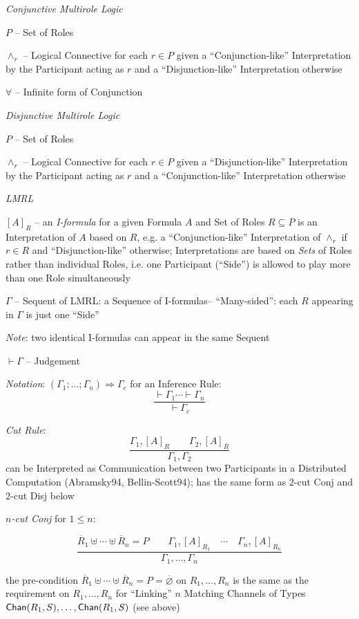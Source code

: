 \emph{Conjunctive Multirole Logic}

$P$ -- Set of Roles

$\wedge_r$ -- Logical Connective for each $r \in P$ given a
``Conjunction-like'' Interpretation by the Participant acting as $r$
and a ``Disjunction-like'' Interpretation otherwise

$\forall$ -- Infinite form of Conjunction


\emph{Disjunctive Multirole Logic}

$P$ -- Set of Roles

$\wedge_r$ -- Logical Connective for each $r \in P$ given a
``Disjunction-like'' Interpretation by the Participant acting as $r$
and a ``Conjunction-like'' Interpretation otherwise


\emph{LMRL}

$[A]_R$ -- an \emph{I-formula} for a given Formula $A$ and Set of
Roles $R \subseteq P$ is an Interpretation of $A$ based on $R$, e.g. a
``Conjunction-like'' Interpretation of $\wedge_r$ if $r \in R$ and
``Disjunction-like'' otherwise; Interpretations are based on
\emph{Sets} of Roles rather than individual Roles, i.e. one
Participant (``Side'') is allowed to play more than one Role
simultaneously

$\Gamma$ -- Sequent of LMRL: a Sequence of I-formulas--
``Many-sided'': each $R$ appearing in $\Gamma$ is just one ``Side''

\fist \emph{Note}: two identical I-formulas can appear in the same
Sequent

$\vdash \Gamma$ -- Judgement

\fist \emph{Notation}: $(\Gamma_1;\ldots;\Gamma_n) \Rightarrow
\Gamma_c$ for an Inference Rule:
\[
  \frac{\vdash \Gamma_1 \cdots \vdash \Gamma_n}{\vdash \Gamma_c}
\]

\emph{Cut Rule}:
\[
  \frac{
    \Gamma_1,[A]_R \quad\quad \Gamma_2,[A]_{\overline{R}}
  }{
    \Gamma_1,\Gamma_2
  }
\]
can be Interpreted as Communication between two Participants in a
Distributed Computation (Abramsky94, Bellin-Scott94); has the same
form as $2$-cut Conj and $2$-cut Disj below


\emph{$n$-cut Conj} for $1 \leq n$:

\[
  \frac{
    \overline{R}_1 \uplus \cdots \uplus \overline{R}_n = P \quad\quad
      \Gamma_1,[A]_{R_1} \quad \cdots \quad \Gamma_n,[A]_{R_n}
  }{
    \Gamma_1, \ldots, \Gamma_n
  }
\]

the pre-condition $\overline{R}_1 \uplus \cdots \uplus \overline{R}_n
= P = \overline{\varnothing}$ on $R_1, \ldots, R_n$ is the same as the
requirement on $R_1, \ldots, R_n$ for ``Linking'' $n$ Matching
Channels of Types $\mathsf{Chan}(R_1,S), \ldots, \mathsf{Chan}(R_1,S)$ (see above)


